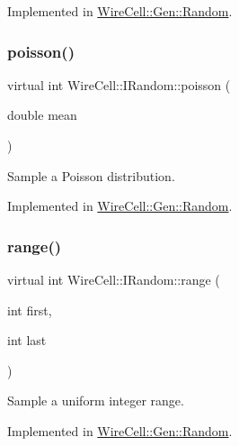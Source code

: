 Implemented in \hyperlink{class_wire_cell_1_1_gen_1_1_random_a0efe5c29dec850c78a0013a30f011320}{Wire\+Cell\+::\+Gen\+::\+Random}.

\mbox{\label{class_wire_cell_1_1_i_random_aae935a94e7a72eccaaf9ad7f1a2fd76a}} 
\subsubsection{\texorpdfstring{poisson()}{poisson()}}
{\footnotesize\ttfamily virtual int Wire\+Cell\+::\+I\+Random\+::poisson (\begin{DoxyParamCaption}\item[{double}]{mean }\end{DoxyParamCaption})\hspace{0.3cm}{\ttfamily [pure virtual]}}



Sample a Poisson distribution. 



Implemented in \hyperlink{class_wire_cell_1_1_gen_1_1_random_abf2ad8cda2e34f349f073a148dd5ac58}{Wire\+Cell\+::\+Gen\+::\+Random}.

\mbox{\label{class_wire_cell_1_1_i_random_a936f25425285556c6be01e4e73ea27fd}} 
\subsubsection{\texorpdfstring{range()}{range()}}
{\footnotesize\ttfamily virtual int Wire\+Cell\+::\+I\+Random\+::range (\begin{DoxyParamCaption}\item[{int}]{first,  }\item[{int}]{last }\end{DoxyParamCaption})\hspace{0.3cm}{\ttfamily [pure virtual]}}



Sample a uniform integer range. 



Implemented in \hyperlink{class_wire_cell_1_1_gen_1_1_random_a84b86a3aaa791e75eb3eb80e1efb1d7e}{Wire\+Cell\+::\+Gen\+::\+Random}.

